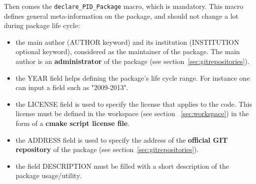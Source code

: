 \documentclass[12pt,a4paper]{article}
\begin{document}
Then comes the \texttt{declare\_PID\_Package} macro, which is mandatory. This macro defines general meta-information on the package, and should not change a lot during package life cycle: 
\begin{itemize}
\item the main author (AUTHOR keyword) and its institution (INSTITUTION optional keyword), considered as the maintainer of the package. The main author is an \textbf{administrator} of the package (see section~\ref{sec:gitrepositories}).
\item the YEAR field helps defining the package's life cycle range. For instance one can input a field such as "2009-2013".
\item the LICENSE field is used to specify the license that applies to the code. This license must be defined in the workspace (see section ~\ref{sec:workspace}) in the form of a \textbf{cmake script license file}.
\item the ADDRESS field is used to specify the address of the \textbf{official GIT repository} of the package (see section~\ref{sec:gitrepositories}).
\item the field DESCRIPTION must be filled with a short description of the package usage/utility.
\end{itemize}
~\\
\end{document}
